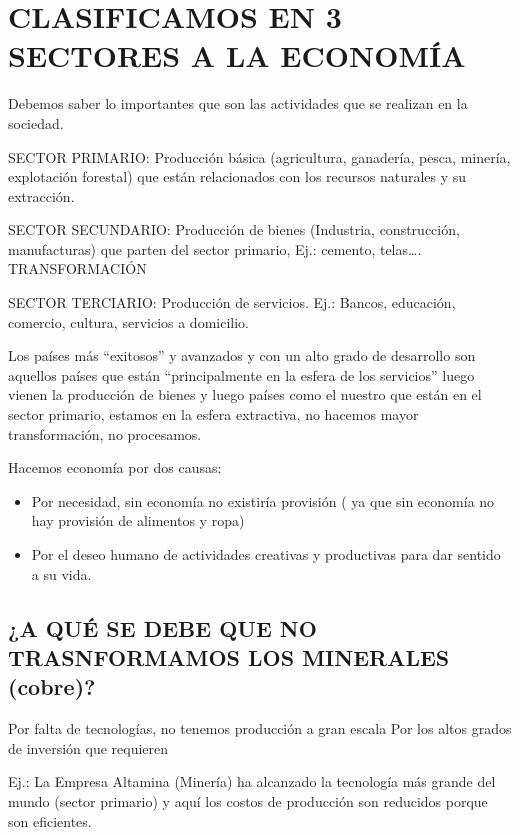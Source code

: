 \documentclass[
  a4paper,
]{article}
\providecommand{\tightlist}{%
  \setlength{\itemsep}{0pt}\setlength{\parskip}{0pt}}\usepackage{longtable,booktabs,array}
\begin{document}
\hypertarget{clasificamos-en-3-sectores-a-la-economuxeda}{%
\section{CLASIFICAMOS EN 3 SECTORES A LA
ECONOMÍA}\label{clasificamos-en-3-sectores-a-la-economuxeda}}

Debemos saber lo importantes que son las actividades que se realizan en
la sociedad.

SECTOR PRIMARIO: Producción básica (agricultura, ganadería, pesca,
minería, explotación forestal) que están relacionados con los recursos
naturales y su extracción.

SECTOR SECUNDARIO: Producción de bienes (Industria, construcción,
manufacturas) que parten del sector primario, Ej.: cemento, telas\ldots.
TRANSFORMACIÓN

SECTOR TERCIARIO: Producción de servicios. Ej.: Bancos, educación,
comercio, cultura, servicios a domicilio.

Los países más ``exitosos'' y avanzados y con un alto grado de
desarrollo son aquellos países que están ``principalmente en la esfera
de los servicios'' luego vienen la producción de bienes y luego países
como el nuestro que están en el sector primario, estamos en la esfera
extractiva, no hacemos mayor transformación, no procesamos.

Hacemos economía por dos causas:

\begin{itemize}
\tightlist
\item
  Por necesidad, sin economía no existiría provisión ( ya que sin
  economía no hay provisión de alimentos y ropa)
\item
  Por el deseo humano de actividades creativas y productivas para dar
  sentido a su vida.
\end{itemize}

\hypertarget{a-quuxe9-se-debe-que-no-trasnformamos-los-minerales-cobre}{%
\subsection{¿A QUÉ SE DEBE QUE NO TRASNFORMAMOS LOS MINERALES
(cobre)?}\label{a-quuxe9-se-debe-que-no-trasnformamos-los-minerales-cobre}}

Por falta de tecnologías, no tenemos producción a gran escala Por los
altos grados de inversión que requieren

Ej.: La Empresa Altamina (Minería) ha alcanzado la tecnología más grande
del mundo (sector primario) y aquí los costos de producción son
reducidos porque son eficientes.
\end{document}

